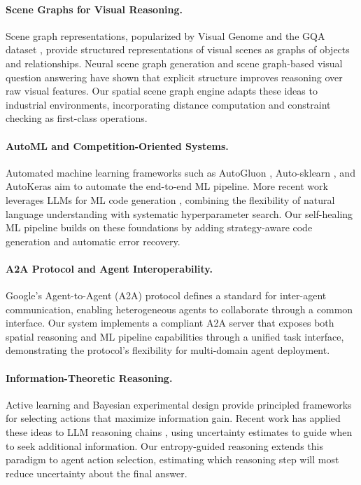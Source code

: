 \documentclass[11pt]{article}
\begin{document}
\paragraph{Scene Graphs for Visual Reasoning.}
Scene graph representations, popularized by Visual Genome \citep{krishna2017visual} and the GQA dataset \citep{hudson2019gqa}, provide structured representations of visual scenes as graphs of objects and relationships. Neural scene graph generation \citep{xu2017scenegraph} and scene graph-based visual question answering \citep{hildebrandt2020scene} have shown that explicit structure improves reasoning over raw visual features. Our spatial scene graph engine adapts these ideas to industrial environments, incorporating distance computation and constraint checking as first-class operations.

\paragraph{AutoML and Competition-Oriented Systems.}
Automated machine learning frameworks such as AutoGluon \citep{erickson2020autogluon}, Auto-sklearn \citep{feurer2019autosklearn}, and AutoKeras \citep{jin2023autokeras} aim to automate the end-to-end ML pipeline. More recent work leverages LLMs for ML code generation \citep{hollmann2024llmautoml}, combining the flexibility of natural language understanding with systematic hyperparameter search. Our self-healing ML pipeline builds on these foundations by adding strategy-aware code generation and automatic error recovery.

\paragraph{A2A Protocol and Agent Interoperability.}
Google's Agent-to-Agent (A2A) protocol \citep{google2024a2a} defines a standard for inter-agent communication, enabling heterogeneous agents to collaborate through a common interface. Our system implements a compliant A2A server that exposes both spatial reasoning and ML pipeline capabilities through a unified task interface, demonstrating the protocol's flexibility for multi-domain agent deployment.

\paragraph{Information-Theoretic Reasoning.}
Active learning \citep{settles2009active} and Bayesian experimental design \citep{chaloner1995bayesian} provide principled frameworks for selecting actions that maximize information gain. Recent work has applied these ideas to LLM reasoning chains \citep{xie2024active}, using uncertainty estimates to guide when to seek additional information. Our entropy-guided reasoning extends this paradigm to agent action selection, estimating which reasoning step will most reduce uncertainty about the final answer.
\end{document}
